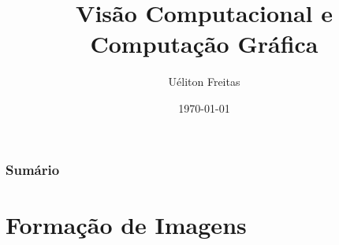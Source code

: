 \documentclass{beamer}
\title[Computação Gráfica]{Visão Computacional e Computação Gráfica} %
\author{Uéliton Freitas} %
\institute[UFMS] %
{
Universidade Católica Don Bosco - UCDB \\ %
\medskip
\textit{freitas.ueliton@gmail.com} %
}
\date{\today} %
\begin{document}
\begin{frame}
\titlepage %
\end{frame}

\begin{frame}
\frametitle{Sumário} %
\tableofcontents %
\end{frame}





\section{Formação de Imagens} 

\end{document}
